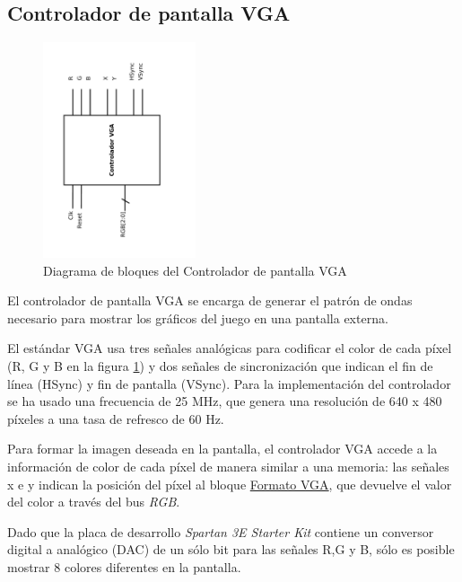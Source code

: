 \subsection{Controlador de pantalla VGA}
\label{vga}

\begin{figure}[H]
	\centering
	\includegraphics[width=0.4\textwidth, angle=-90] {vga_block.pdf}
	\caption{Diagrama de bloques del Controlador de pantalla VGA}\label{fig:vgaBlock}
\end{figure}

El controlador de pantalla VGA se encarga de generar el patrón de ondas necesario para mostrar los gráficos del juego en una pantalla externa.

El estándar VGA usa tres señales analógicas para codificar el color de cada píxel (R, G y B en la figura \ref{fig:vgaBlock}) y dos señales de sincronización que indican el fin de línea (HSync) y fin de pantalla (VSync). Para la implementación del controlador se ha usado una frecuencia de 25 MHz, que genera una resolución de 640 x 480 píxeles a una tasa de refresco de 60 Hz.

Para formar la imagen deseada en la pantalla, el controlador VGA accede a la información de color de cada píxel de manera similar a una memoria: las señales x e y indican la posición del píxel al bloque \hyperref[formatoVGA]{Formato VGA}, que devuelve el valor del color a través del bus \emph{RGB}. 

Dado que la placa de desarrollo \emph{Spartan 3E Starter Kit} contiene un conversor digital a analógico (DAC) de un sólo bit para las señales R,G y B, sólo es posible mostrar 8 colores diferentes en la pantalla.